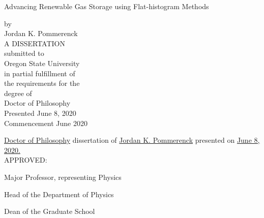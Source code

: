 \newpage{}
\thispagestyle{empty}
\singlespacing

\begin{center}
Advancing Renewable Gas Storage using Flat-histogram Methods

\vspace{1.0cm}
by \\
Jordan K. Pommerenck \\
\vspace{3.0cm}
A DISSERTATION \\
\vspace{0.5cm}
submitted to \\
\vspace{0.5cm}
Oregon State University \\
\vspace{3.0cm}
in partial fulfillment of \\
the requirements for the \\
degree of \\
\vspace{1.0cm}
Doctor of Philosophy \\
\vspace{3.0cm}
Presented June 8, 2020  \\
Commencement June 2020
\end{center}

\newpage{}
\thispagestyle{empty}
\singlespacing
\justify{}
\underline{Doctor of Philosophy} dissertation of \underline{Jordan K. Pommerenck} presented on
\underline{June 8, 2020.} \\

\justify{}
\vspace{0.5cm}
APPROVED: \\

\justify{}
\underline{\hspace{15cm}}
\begin{flushleft}
Major Professor, representing Physics
\vspace{1.0cm}
\end{flushleft}

\justify{}
\underline{\hspace{15cm}}
\begin{flushleft}
Head of the Department of Physics
\vspace{1.0cm}
\end{flushleft}

\justify{}
\underline{\hspace{15cm}}
\begin{flushleft}
Dean of the Graduate School
\vspace{1.0cm}
\end{flushleft}

